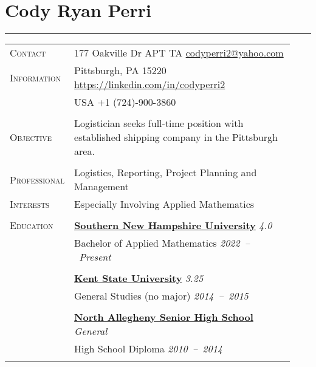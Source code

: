 \documentclass[letterpaper, 10pt, oneside]{article}
\newcommand{\stitle}[1]{\normalsize{\textsc{#1}}}
\begin{document}
\noindent\section*{Cody Ryan Perri}
\rule{\textwidth}{0.5ex}


\noindent \begin{longtable}{@{} p{0.13\linewidth} p{0.8\linewidth}}
  \stitle{Contact}     & 177 Oakville Dr APT TA
  \hfill \href{mailto:codyperri2@yahoo.com}{codyperri2@yahoo.com} \\
  
  \stitle{Information} & Pittsburgh, PA 15220
  \hfill \url{https://linkedin.com/in/codyperri2} \\
  
  & USA \hfill \textcolor{color-url}{+1 (724)-900-3860} \\ \\

  \stitle{Objective} & Logistician seeks full-time position with established shipping company in the Pittsburgh area.\\ \\
  
  \stitle{Professional} & Logistics, Reporting, Project Planning and Management \\
  \stitle{Interests}   & Especially Involving Applied Mathematics \\ \\

  \stitle{Education}
  
  & \textbf{\href{https://www.snhu.edu/}{Southern New Hampshire University}}
  \hfill \textsl{4.0} \\[-1.25em] & Bachelor of Applied Mathematics
  \hfill \hspace{-3em} \textsl{2022\ --\ Present} \\

  \\[-1.8ex]

  & \textbf{\href{https://www.kent.edu/}{Kent State University}}
  \hfill \textsl{3.25} \\
  & General Studies (no major)
  \hfill \hspace{-3em} \textsl{2014\ --\ 2015} \\

  \\[-1.8ex]

  & \textbf{\href{https://www.northallegheny.org/}{North Allegheny Senior High School}}
  \hfill \textsl{General} \\
  & High School Diploma
  \hfill \hspace{-3em} \textsl{2010\ --\ 2014} \\ \\


\end{longtable}
\end{document}
